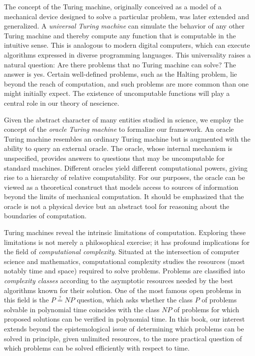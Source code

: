 The concept of the Turing machine, originally conceived as a model of a mechanical device designed to solve a particular problem, was later extended and generalized. A \emph{universal Turing machine} can simulate the behavior of any other Turing machine and thereby compute any function that is computable in the intuitive sense. This is analogous to modern digital computers, which can execute algorithms expressed in diverse programming languages. This universality raises a natural question: Are there problems that no Turing machine can solve? The answer is yes. Certain well-defined problems, such as the Halting problem, lie beyond the reach of computation, and such problems are more common than one might initially expect. The existence of uncomputable functions will play a central role in our theory of nescience.

Given the abstract character of many entities studied in science, we employ the concept of the \emph{oracle Turing machine} to formalize our framework. An oracle Turing machine resembles an ordinary Turing machine but is augmented with the ability to query an external oracle. The oracle, whose internal mechanism is unspecified, provides answers to questions that may be uncomputable for standard machines. Different oracles yield different computational powers, giving rise to a hierarchy of relative computability. For our purposes, the oracle can be viewed as a theoretical construct that models access to sources of information beyond the limits of mechanical computation. It should be emphasized that the oracle is not a physical device but an abstract tool for reasoning about the boundaries of computation.

Turing machines reveal the intrinsic limitations of computation. Exploring these limitations is not merely a philosophical exercise; it has profound implications for the field of \emph{computational complexity}. Situated at the intersection of computer science and mathematics, computational complexity studies the resources (most notably time and space) required to solve problems. Problems are classified into \emph{complexity classes} according to the asymptotic resources needed by the best algorithms known for their solution. One of the most famous open problems in this field is the $P\overset{?}{=}NP$ question, which asks whether the class $P$ of problems solvable in polynomial time coincides with the class $NP$ of problems for which proposed solutions can be verified in polynomial time. In this book, our interest extends beyond the epistemological issue of determining which problems can be solved in principle, given unlimited resources, to the more practical question of which problems can be solved efficiently with respect to time.

